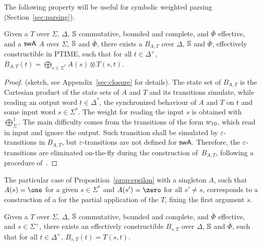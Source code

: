 


\noindent
The following property will be useful for
symbolic weighted parsing (Section~\ref{sec:parsing}).

\begin{proposition} \label{prop:epsilon}
Given a \SWT $T$ over $\Sigma$, $\Delta$,
$\mathbb{S}$ commutative, bounded and complete,
and $\bar\Phi$ effective,
and a $\textsf{swA}$ $A$ over $\Sigma$, $\mathbb{S}$ and $\bar\Phi$,
there exists a \SWA $B_{A, T}$ over $\Delta$, $\mathbb{S}$ and $\bar\Phi$,
effectively constructible in PTIME, 
such that for all $t \in \Delta^+$,
$B_{A, T}(t) = \displaystyle\bigoplus_{s\in \Sigma^*} A(s) \otimes T(s, t)$.
\end{proposition}
%
\begin{proof}
(sketch, see Appendix~\ref{sec:closure} for details).
The state set of $B_{A, T}$ is the Cartesian product of
the state sets of $A$ and $T$ and its transitions simulate,
while reading an output word $t \in \Delta^*$, the
synchronized behaviour of $A$ and $T$ on $t$
and some input word $s \in \Sigma^*$.
The weight for reading the input $s$ is obtained with
$\bigoplus^1_\Sigma$.
%
The main difficulty comes from the transitions
of the form $\wei_{10}$, which read in input and ignore the output.
Such transition shall be simulated by $\varepsilon$-transitions in $B_{A, T}$,
but $\varepsilon$-transitions are not defined for $\textsf{swA}$.
Therefore, the $\varepsilon$-transitions
are eliminated on-the-fly during the construction of~$B_{A, T}$,
following a procedure of~\cite{LombardySakarovitch12ciaa}.
\end{proof}

%
The particular case of Proposition~\ref{prop:epsilon} with a singleton $A$,
\ie such that $A(s) = \one$ for a given $s \in \Sigma^*$
and $A(s') = \zero$ for all $s' \neq s$,
corresponds to a construction of a \SWA for the partial application of the \SWT $T$,
fixing the first argument $s$.
\begin{corollary} \label{cor:epsilon}
Given a \SWT $T$ over $\Sigma$, $\Delta$,
$\mathbb{S}$ commutative, bounded and complete,
and $\bar\Phi$ effective,
and $s \in \Sigma^+$,
there exists an effectively constructible \SWA
$B_{s, T}$ over $\Delta$, $\mathbb{S}$ and $\bar\Phi$,
such that for all $t \in \Delta^+$, $B_{s, T}(t) = T(s, t)$.
\end{corollary}


